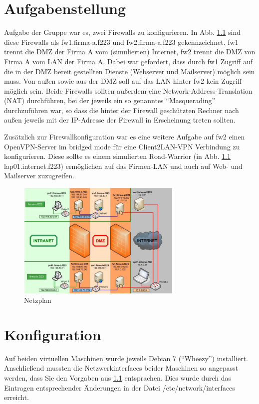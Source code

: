 \chapter{Aufgabenstellung}
Aufgabe der Gruppe war es, zwei Firewalls zu konfigurieren. In Abb. \ref{fig:netzplan} sind diese Firewalls als fw1.firma-a.f223 und fw2.firma-a.f223 gekennzeichnet. fw1 trennt die DMZ der Firma A vom (simulierten) Internet, fw2 trennt die DMZ von Firma A vom LAN der Firma A. Dabei war gefordert, dass durch fw1 Zugriff auf die in der DMZ bereit gestellten Dienste (Webserver und Mailserver) möglich sein muss. Von außen sowie aus der DMZ soll auf das LAN hinter fw2 kein Zugriff möglich sein. Beide Firewalls sollten außerdem eine Network-Address-Translation (NAT) durchführen, bei der jeweils ein so genanntes "`Masquerading"' durchzuführen war, so dass die hinter der Firewall geschützten Rechner nach außen jeweils mit der IP-Adresse der Firewall in Erscheinung treten sollten.

Zusätzlich zur Firewallkonfiguration war es eine weitere Aufgabe auf fw2 einen OpenVPN-Server im bridged mode für eine Client2LAN-VPN Verbindung zu konfigurieren. Diese sollte es einem simulierten Road-Warrior (in Abb. \ref{fig:netzplan} lap01.internet.f223) ermöglichen auf das Firmen-LAN und auch auf Web- und Mailserver zuzugreifen.

\begin{figure}[h!]
	\centering
		\includegraphics[width=0.7\textwidth]{figures/netzplan.PNG}
	\caption{Netzplan \cite{Neuschwander2014}}
	\label{fig:netzplan}
\end{figure}

\chapter{Konfiguration}
Auf beiden virtuellen Maschinen wurde jeweils Debian 7 ("`Wheezy"') installiert. Anschließend mussten die Netzwerkinterfaces beider Maschinen so angepasst werden, dass Sie den Vorgaben aus \ref{fig:netzplan} entsprachen. Dies wurde durch das Eintragen entsprechender Änderungen in der Datei /etc/network/interfaces erreicht.

